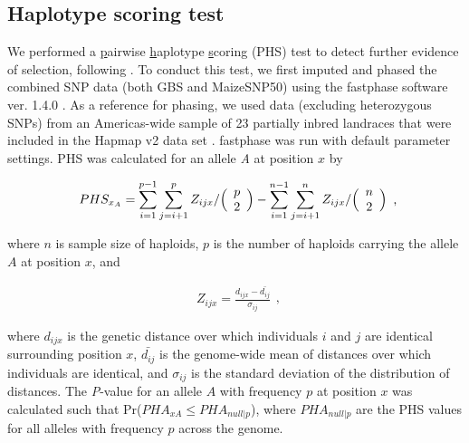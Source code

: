 \subsection*{Haplotype scoring test}
We performed a \underline{p}airwise \underline{h}aplotype \underline{s}coring (PHS) test to detect further evidence of selection, following \cite{Toomajian_2006_16623598}.  
To conduct this test, we first imputed and phased the combined SNP data (both GBS and MaizeSNP50) using the {\sf fastphase} software ver. 1.4.0 \cite[]{Scheet_2006_16532393}.  
As a reference for phasing, we used data (excluding heterozygous SNPs) from an Americas-wide sample of 23 partially inbred landraces that were included in the Hapmap v2 data set  \cite[]{Chia_2012_22660545}.  
%
%
{\sf fastphase} was run with default parameter settings.  PHS was calculated for an allele \emph{A} at position $x$ by

\begin{equation}
  \label{phs-1}
  \begin{array}{l}
  \displaystyle{
PHS_{x_A} = \sum^{p-1}_{i=1}\sum^{p}_{j=i+1}Z_{ijx}  / \Bigl( \begin{array}{c} p \\ 2 \\ \end{array} \Bigr) 
- \sum^{n-1}_{i=1}\sum^{n}_{j=i+1}Z_{ijx}  / \Bigl( \begin{array}{c} n \\ 2 \\ \end{array} \Bigr) 
  }
  \end {array} 
  \textrm{,}
\end{equation}

\noindent where $n$ is sample size of haploids, $p$  is the number of haploids carrying the allele $A$ at position $x$, and

\begin{equation}
  \label{phs-2}
  \begin{array}{l}
  \displaystyle{
Z_{ijx} = \frac{ d_{ijx} - \bar{d_{ij}} }{ \sigma_{ij} }
  }
  \end {array} 
  \textrm{,}
\end{equation}

\noindent where $d_{ijx}$ is the genetic distance over which individuals $i$ and $j$ are identical surrounding position $x$, $\bar{d_{ij}}$ is the genome-wide mean of distances over which individuals are identical, and $\sigma_{ij}$ is the standard deviation of the distribution of distances.  
The \emph{P}-value for an allele $A$ with frequency $p$ at position $x$ was calculated such that Pr($PHA_{xA}\leq PHA_{null|p}$), where $PHA_{null|p}$ are the PHS values for all alleles with frequency $p$ across the genome. 

